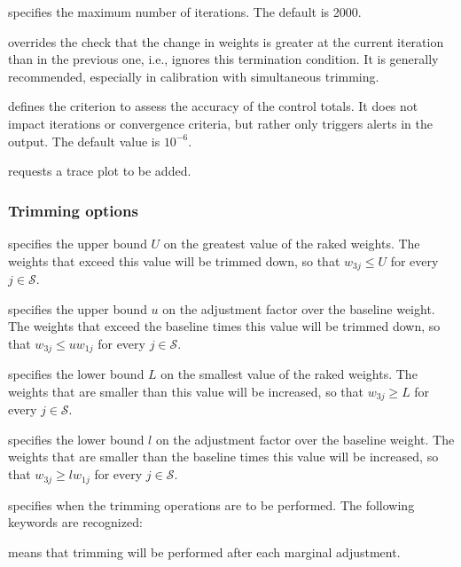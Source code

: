 \hangpara
{} specifies the maximum number
of iterations. The default is 2000.

\hangpara
{} overrides the check
that the change in weights is greater at the current iteration
than in the previous one, i.e., ignores this termination condition.
It is generally recommended, especially in calibration with simultaneous trimming.

\hangpara
{} defines the criterion to
assess the accuracy of the control totals. It does not impact
iterations or convergence criteria, but rather only triggers alerts in the output.
The default value is $10^{-6}$.

\hangpara
{} requests a trace plot to be added.

\subsubsection{Trimming options}
\label{subsubsec:trimming}

\hangpara
{} specifies the upper bound $U$ on the greatest
    value of the raked weights.  The weights that
    exceed this value will be trimmed down, so that
    $w_{3j} \le U$ for every $j\in\mathcal{S}$.

\hangpara
{} specifies the upper bound $u$ on the adjustment
    factor over the baseline weight. The weights
    that exceed the baseline times this value will be trimmed down,
    so that $w_{3j} \le u w_{1j}$ for every $j\in\mathcal{S}$.

\hangpara
{} specifies the lower bound $L$ on the smallest value
    of the raked weights.  The weights that are smaller than this value will
    be increased, so that $w_{3j} \ge L$ for every $j\in\mathcal{S}$.

\hangpara
{} specifies the lower bound $l$ on the adjustment factor
    over the baseline weight.  The weights that are smaller than the baseline
    times this value will be increased, so that
    $w_{3j} \ge l w_{1j}$ for every $j\in\mathcal{S}$.

\hangpara
{} specifies when the trimming operations
    are to be performed. The following keywords are recognized:

\morehang {} means that trimming will be performed
    after each marginal adjustment.

